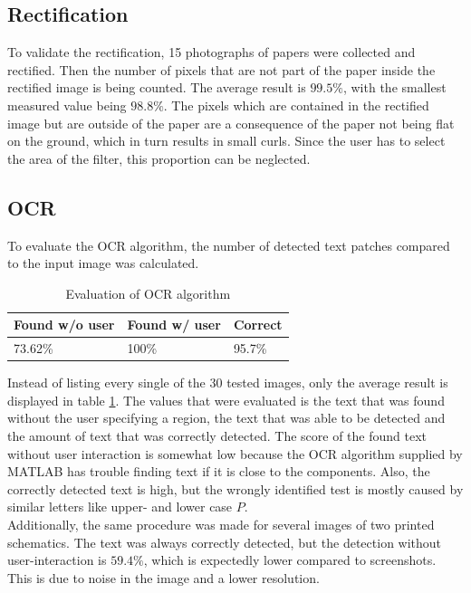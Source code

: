 \documentclass[10pt,twocolumn,letterpaper]{article}
\begin{document}
\subsection{Rectification}

To validate the rectification, 15 photographs of papers were collected and rectified. Then the number of pixels that are not part of the paper inside the rectified image is being counted. The average result is $99.5\%$, with the smallest measured value being $98.8\%$. The pixels which are contained in the rectified image but are outside of the paper are a consequence of the paper not being flat on the ground, which in turn results in small curls. Since the user has to select the area of the filter, this proportion can be neglected.

\subsection{OCR}

To evaluate the OCR algorithm, the number of detected text patches compared to the input image was calculated. 

\begin{table}[!ht]
\centering
\caption{Evaluation of OCR algorithm}
\label{tab:ocr}
\begin{tabular}{|l|l|l|}
\hline
Found w/o user & Found w/ user & Correct \\ \hline
73.62\%        & 100\%         & 95.7\%  \\ \hline
\end{tabular}
\end{table}

Instead of listing every single of the 30 tested images, only the average result is displayed in table \ref{tab:ocr}. The values that were evaluated is the text that was found without the user specifying a region, the text that was able to be detected and the amount of text that was correctly detected. The score of the found text without user interaction is somewhat low because the OCR algorithm supplied by MATLAB has trouble finding text if it is close to the components. Also, the correctly detected text is high, but the wrongly identified test is mostly caused by similar letters like upper- and lower case $P$.\\
Additionally, the same procedure was made for several images of two printed schematics. The text was always correctly detected, but the detection without user-interaction is $59.4\%$, which is expectedly lower compared to screenshots. This is due to noise in the image and a lower resolution.
\end{document}
